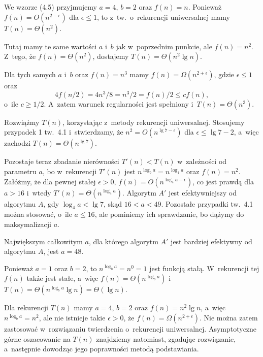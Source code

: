 
\exercise %

\subexercise
We wzorze (4.5) przyjmujemy $a=4$, $b=2$ oraz $f(n)=n$.
Ponieważ $f(n)=O(n^{2-\epsilon})$ dla $\epsilon\le1$, to z~tw.\ o~rekurencji uniwersalnej mamy $T(n)=\Theta(n^2)$.

\subexercise
Tutaj mamy te same wartości $a$ i~$b$ jak w~poprzednim punkcie, ale $f(n)=n^2$.
Z~tego, że $f(n)=\Theta(n^2)$, dostajemy $T(n)=\Theta(n^2\lg n)$.

\subexercise
Dla tych samych $a$ i~$b$ oraz $f(n)=n^3$ mamy $f(n)=\Omega(n^{2+\epsilon})$, gdzie $\epsilon\le1$ oraz
\[
	4f(n/2) = 4n^3\!/8 = n^3\!/2 = f(n)/2 \le cf(n),
\]
o~ile $c\ge1/2$.
A~zatem warunek regularności jest spełniony i~$T(n)=\Theta(n^3)$.

\exercise %
Rozwiążmy $T(n)$, korzystając z~metody rekurencji uniwersalnej.
Stosujemy przypadek 1 tw.\ 4.1 i~stwierdzamy, że $n^2=O(n^{\lg7-\epsilon})$ dla $\epsilon\le\lg7-2$, a~więc zachodzi $T(n)=\Theta(n^{\lg7})$.

Pozostaje teraz zbadanie nierówności $T'(n)<T(n)$ w~zależności od parametru $a$, bo w~rekurencji $T'(n)$ jest $n^{\log_ba}=n^{\log_4a}$ oraz $f(n)=n^2$.
Załóżmy, że dla pewnej stałej $\epsilon>0$, $f(n)=O(n^{\log_4a-\epsilon})$, co jest prawdą dla $a>16$ i~wtedy $T'(n)=\Theta(n^{\log_4a})$.
Algorytm $A'$ jest efektywniejszy od algorytmu $A$, gdy $\log_4a<\lg7$, skąd $16<a<49$.
Pozostałe przypadki tw.\ 4.1 można stosować, o~ile $a\le16$, ale pominiemy ich sprawdzanie, bo dążymy do maksymalizacji $a$.

Największym całkowitym $a$, dla którego algorytm $A'$ jest bardziej efektywny od algorytmu $A$, jest $a=48$.

\exercise %
Ponieważ $a=1$ oraz $b=2$, to $n^{\log_ba}=n^0=1$ jest funkcją stałą.
W~rekurencji tej $f(n)$ także jest stałe, a~więc $f(n)=\Theta(n^{\log_ba})$ i~$T(n)=\Theta(n^{\log_ba}\lg n)=\Theta(\lg n)$.

\exercise %
Dla rekurencji $T(n)$ mamy $a=4$, $b=2$ oraz $f(n)=n^2\lg n$, a~więc $n^{\log_ba}=n^2$, ale nie istnieje takie $\epsilon>0$, że $f(n)=\Omega(n^{2+\epsilon})$.
Nie można zatem zastosować w~rozwiązaniu twierdzenia o~rekurencji uniwersalnej.
Asymptotyczne górne oszacowanie na $T(n)$ znajdziemy natomiast, zgadując rozwiązanie, a~następnie dowodząc jego poprawności metodą podstawiania.

